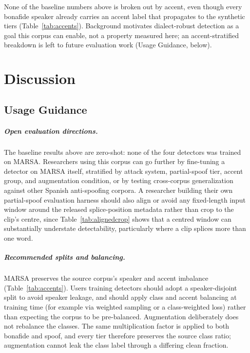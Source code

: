 \documentclass[11pt]{report}
\begin{document}
None of the baseline numbers above is broken out by accent, even
though every bonafide speaker already carries an accent label that
propagates to the synthetic tiers (Table~\ref{tab:accents}).
Background motivates dialect-robust detection as a goal this corpus
can enable, not a property measured here; an accent-stratified
breakdown is left to future evaluation work (Usage Guidance, below).

\chapter{Discussion}
\label{ch:discussion}

\section{Usage Guidance}

\paragraph{Open evaluation directions.} The baseline results above are
zero-shot: none of the four detectors was trained on MARSA.
Researchers using this corpus can go further by fine-tuning a detector
on MARSA itself, stratified by attack system, partial-spoof tier,
accent group, and augmentation condition, or by testing cross-corpus
generalization against other Spanish anti-spoofing corpora. A
researcher building their own partial-spoof evaluation harness should
also align or avoid any fixed-length input window around the released
splice-position metadata rather than crop to the clip's centre, since
Table~\ref{tab:alignedcrop} shows that a centred window can
substantially understate detectability, particularly where a clip
splices more than one word.

\paragraph{Recommended splits and balancing.} MARSA preserves the
source corpus's speaker and accent imbalance (Table~\ref{tab:accents}).
Users training detectors should adopt a speaker-disjoint split to avoid
speaker leakage, and should apply class and accent balancing at
training time (for example via weighted sampling or a class-weighted
loss) rather than expecting the corpus to be pre-balanced.
Augmentation deliberately does not rebalance the classes. The same
multiplication factor is applied to both bonafide and spoof, and every
tier therefore preserves the source class ratio; augmentation cannot
leak the class label through a differing clean fraction.
\end{document}
